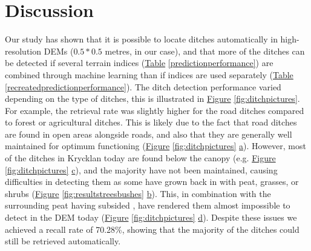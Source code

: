 \documentclass[11pt, review]{elsarticle} %
\begin{document}
\section{Discussion}

Our study has shown that it is possible to locate ditches automatically in high-resolution DEMs ($0.5  * 0.5 $ metres, in our case), and that more of the ditches can be detected if several terrain indices (\hyperref[predictionperformance]{Table} \ref{predictionperformance}) are combined through machine learning than if indices are used separately (\hyperref[recreatedpredictionperformance]{Table} \ref{recreatedpredictionperformance}). The ditch detection performance varied depending on the type of ditches, this is illustrated in \hyperref[fig:ditchpictures]{Figure} \ref{fig:ditchpictures}. For example, the retrieval rate was slightly higher for the road ditches compared to forest or agricultural ditches. This is likely due to the fact that  road ditches are found in open areas alongside roads, and also that they are generally well maintained for optimum functioning (\hyperref[fig:ditchpictures]{Figure} \ref{fig:ditchpictures} \hyperref[fig:ditchpictures]{a}). However, most of the ditches in Krycklan today are found below the canopy (e.g. \hyperref[fig:ditchpictures]{Figure} \ref{fig:ditchpictures} \hyperref[fig:ditchpictures]{c}), and the majority have not been maintained, causing difficulties in detecting them as some have grown back in with peat, grasses, or shrubs (\hyperref[fig:resultstreesbushes]{Figure} \ref{fig:resultstreesbushes} \hyperref[fig:resultstreesbushes]{b}). This, in combination with the surrounding peat having subsided \citep{heikurainen}, have rendered them almost impossible to detect in the DEM today (\hyperref[fig:ditchpictures]{Figure} \ref{fig:ditchpictures} \hyperref[fig:ditchpictures]{d}). Despite these issues we achieved a recall rate of 70.28\%, showing that the majority of the ditches could still be retrieved automatically.
\end{document}
